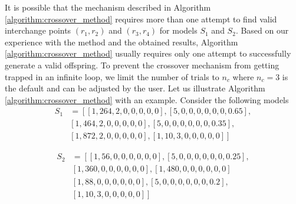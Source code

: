 \documentclass[12pt]{elsart}%
\begin{document}
It is possible that the mechanism described in Algorithm \ref{algorithm:crossover_method} requires more than one attempt to find valid interchange points $(r_1, r_2)$ and  $(r_3, r_4)$ for models $S_1$ and $S_2$. Based on our experience with the method and the obtained results,  Algorithm \ref{algorithm:crossover_method} usually requires only one attempt to successfully generate a valid offspring. To prevent the crossover mechanism from getting trapped in an infinite loop, we limit the number of trials to $n_c$ where $n_c=3$ is the default and can be adjusted by the user. Let us illustrate Algorithm \ref{algorithm:crossover_method} with an example. Consider the following models
\begin{align*}
S_1 & = \left[ \left[1, 264, 2, 0, 0, 0, 0, 0 \right], \left[5, 0, 0, 0, 0, 0, 0, 0.65 \right], \right. \\
& \left. \left[1, 464, 2, 0, 0, 0, 0, 0 \right], \left[5, 0, 0, 0, 0, 0, 0, 0.35 \right], \right. \\
& \left. \left[1, 872, 2, 0, 0, 0, 0, 0 \right], \left[1, 10, 3, 0, 0, 0, 0, 0 \right] \right]
\end{align*}

\begin{align*}
S_2 & = \left[ \left[1, 56, 0, 0, 0, 0, 0, 0 \right], \left[5, 0, 0, 0, 0, 0, 0, 0.25 \right], \right. \\
&  \left. \left[1, 360, 0, 0, 0, 0, 0, 0 \right], \left[1, 480, 0, 0, 0, 0, 0, 0 \right] \right. \\
&  \left. \left[1, 88, 0, 0, 0, 0, 0, 0 \right], \left[5, 0, 0, 0, 0, 0, 0, 0.2 \right], \right. \\
&  \left. \left[1, 10, 3, 0, 0, 0, 0, 0 \right] \right]
\end{align*}
\end{document}
